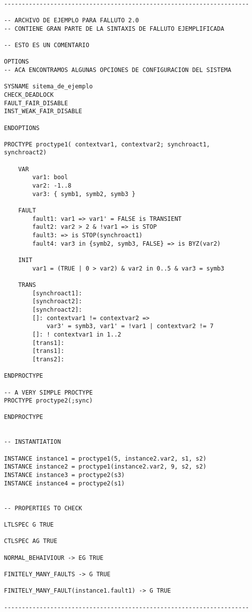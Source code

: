 \documentclass[titlepage, 12pt]{book}
\begin{document}
\begin{verbatim}

---------------------------------------------------------------------

-- ARCHIVO DE EJEMPLO PARA FALLUTO 2.0
-- CONTIENE GRAN PARTE DE LA SINTAXIS DE FALLUTO EJEMPLIFICADA

-- ESTO ES UN COMENTARIO 

OPTIONS
-- ACA ENCONTRAMOS ALGUNAS OPCIONES DE CONFIGURACION DEL SISTEMA

SYSNAME sitema_de_ejemplo
CHECK_DEADLOCK
FAULT_FAIR_DISABLE
INST_WEAK_FAIR_DISABLE

ENDOPTIONS

PROCTYPE proctype1( contextvar1, contextvar2; synchroact1, synchroact2)

    VAR
        var1: bool
        var2: -1..8
        var3: { symb1, symb2, symb3 }

    FAULT
        fault1: var1 => var1' = FALSE is TRANSIENT
        fault2: var2 > 2 & !var1 => is STOP
        fault3: => is STOP(synchroact1)
        fault4: var3 in {symb2, symb3, FALSE} => is BYZ(var2)

    INIT
        var1 = (TRUE | 0 > var2) & var2 in 0..5 & var3 = symb3

    TRANS
        [synchroact1]:
        [synchroact2]:
        [synchroact2]: 
        []: contextvar1 != contextvar2 => 
            var3' = symb3, var1' = !var1 | contextvar2 != 7
        []: ! contextvar1 in 1..2
        [trans1]:
        [trans1]:
        [trans2]:

ENDPROCTYPE

-- A VERY SIMPLE PROCTYPE
PROCTYPE proctype2(;sync)

ENDPROCTYPE


-- INSTANTIATION

INSTANCE instance1 = proctype1(5, instance2.var2, s1, s2)
INSTANCE instance2 = proctype1(instance2.var2, 9, s2, s2)
INSTANCE instance3 = proctype2(s3)
INSTANCE instance4 = proctype2(s1)


-- PROPERTIES TO CHECK

LTLSPEC G TRUE

CTLSPEC AG TRUE

NORMAL_BEHAIVIOUR -> EG TRUE

FINITELY_MANY_FAULTS -> G TRUE

FINITELY_MANY_FAULT(instance1.fault1) -> G TRUE

---------------------------------------------------------------------
\end{verbatim}
~\\
\end{document}
